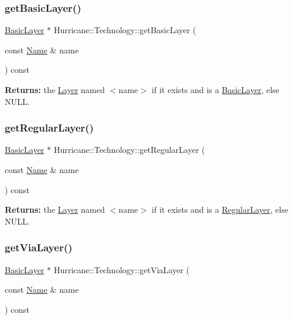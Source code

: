 \subsubsection{\texorpdfstring{get\+Basic\+Layer()}{getBasicLayer()}}
{\footnotesize\ttfamily \mbox{\hyperlink{classHurricane_1_1BasicLayer}{Basic\+Layer}} $\ast$ Hurricane\+::\+Technology\+::get\+Basic\+Layer (\begin{DoxyParamCaption}\item[{const \mbox{\hyperlink{classHurricane_1_1Name}{Name}} \&}]{name }\end{DoxyParamCaption}) const}

{\bfseries Returns\+:} the \mbox{\hyperlink{classHurricane_1_1Layer}{Layer}} named {\ttfamily $<$name$>$} if it exists and is a \mbox{\hyperlink{classHurricane_1_1BasicLayer}{Basic\+Layer}}, else {\ttfamily N\+U\+LL}. \mbox{\label{classHurricane_1_1Technology_a0e93f2f749ee9b6efd30de4ef74546cc}} 
\subsubsection{\texorpdfstring{get\+Regular\+Layer()}{getRegularLayer()}}
{\footnotesize\ttfamily \mbox{\hyperlink{classHurricane_1_1BasicLayer}{Basic\+Layer}} $\ast$ Hurricane\+::\+Technology\+::get\+Regular\+Layer (\begin{DoxyParamCaption}\item[{const \mbox{\hyperlink{classHurricane_1_1Name}{Name}} \&}]{name }\end{DoxyParamCaption}) const}

{\bfseries Returns\+:} the \mbox{\hyperlink{classHurricane_1_1Layer}{Layer}} named {\ttfamily $<$name$>$} if it exists and is a \mbox{\hyperlink{classHurricane_1_1RegularLayer}{Regular\+Layer}}, else {\ttfamily N\+U\+LL}. \mbox{\label{classHurricane_1_1Technology_a9edd085c08487642dd8745b66cf40c76}} 
\subsubsection{\texorpdfstring{get\+Via\+Layer()}{getViaLayer()}}
{\footnotesize\ttfamily \mbox{\hyperlink{classHurricane_1_1BasicLayer}{Basic\+Layer}} $\ast$ Hurricane\+::\+Technology\+::get\+Via\+Layer (\begin{DoxyParamCaption}\item[{const \mbox{\hyperlink{classHurricane_1_1Name}{Name}} \&}]{name }\end{DoxyParamCaption}) const}


